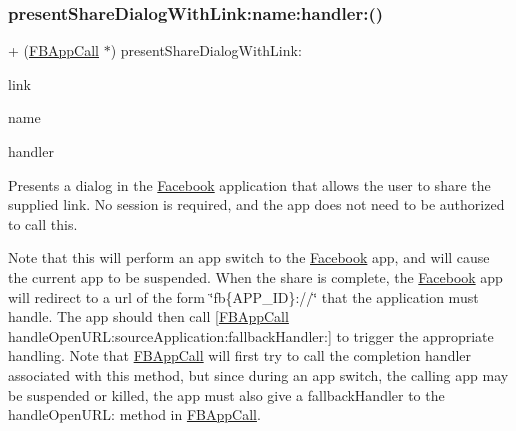 \subsubsection{\texorpdfstring{present\+Share\+Dialog\+With\+Link\+:name\+:handler\+:()}{presentShareDialogWithLink:name:handler:()}\hspace{0.1cm}{\footnotesize\ttfamily [2/5]}}
{\footnotesize\ttfamily + (\hyperlink{interfaceFBAppCall}{F\+B\+App\+Call} $\ast$) present\+Share\+Dialog\+With\+Link\+: \begin{DoxyParamCaption}\item[{(N\+S\+U\+RL $\ast$)}]{link }\item[{name:(N\+S\+String $\ast$)}]{name }\item[{handler:(F\+B\+Dialog\+App\+Call\+Completion\+Handler)}]{handler }\end{DoxyParamCaption}}

Presents a dialog in the \hyperlink{interfaceFacebook}{Facebook} application that allows the user to share the supplied link. No session is required, and the app does not need to be authorized to call this.

Note that this will perform an app switch to the \hyperlink{interfaceFacebook}{Facebook} app, and will cause the current app to be suspended. When the share is complete, the \hyperlink{interfaceFacebook}{Facebook} app will redirect to a url of the form \char`\"{}fb\{\+A\+P\+P\+\_\+\+I\+D\}\+://\char`\"{} that the application must handle. The app should then call \mbox{[}\hyperlink{interfaceFBAppCall}{F\+B\+App\+Call} handle\+Open\+U\+R\+L\+:source\+Application\+:fallback\+Handler\+:\mbox{]} to trigger the appropriate handling. Note that \hyperlink{interfaceFBAppCall}{F\+B\+App\+Call} will first try to call the completion handler associated with this method, but since during an app switch, the calling app may be suspended or killed, the app must also give a fallback\+Handler to the handle\+Open\+U\+RL\+: method in \hyperlink{interfaceFBAppCall}{F\+B\+App\+Call}.


